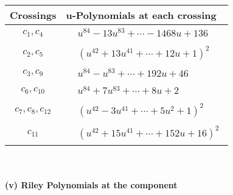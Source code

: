 \documentclass[1p]{elsarticle_modified}
\theoremstyle{definition}
\begin{document}
\begin{tabular}{m{50pt}|m{274pt}}
Crossings & \hspace{64pt}u-Polynomials at each crossing \\
\hline $$\begin{aligned}c_{1},c_{4}\end{aligned}$$&$\begin{aligned}
&u^{84}-13 u^{83}+\cdots-1468 u+136
\end{aligned}$\\
\hline $$\begin{aligned}c_{2},c_{5}\end{aligned}$$&$\begin{aligned}
&(u^{42}+13 u^{41}+\cdots+12 u+1)^{2}
\end{aligned}$\\
\hline $$\begin{aligned}c_{3},c_{9}\end{aligned}$$&$\begin{aligned}
&u^{84}- u^{83}+\cdots+192 u+46
\end{aligned}$\\
\hline $$\begin{aligned}c_{6},c_{10}\end{aligned}$$&$\begin{aligned}
&u^{84}+7 u^{83}+\cdots+8 u+2
\end{aligned}$\\
\hline $$\begin{aligned}c_{7},c_{8},c_{12}\end{aligned}$$&$\begin{aligned}
&(u^{42}-3 u^{41}+\cdots+5 u^2+1)^{2}
\end{aligned}$\\
\hline $$\begin{aligned}c_{11}\end{aligned}$$&$\begin{aligned}
&(u^{42}+15 u^{41}+\cdots+152 u+16)^{2}
\end{aligned}$\\
\hline
\end{tabular}\\~\\
\newpage\renewcommand{\arraystretch}{1}
\flushleft \textbf{(v) Riley Polynomials at the component}\newline \\
\end{document}
